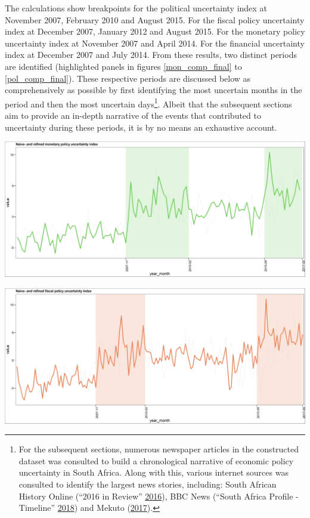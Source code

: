 \documentclass[11pt,preprint, authoryear]{elsarticle}
\let\origfigure\figure
\let\endorigfigure\endfigure
\renewenvironment{figure}[1][2] {
    \expandafter\origfigure\expandafter[H]
} {
    \endorigfigure
}
\numberwithin{equation}{section}
\numberwithin{figure}{section}
\numberwithin{table}{section}
\let\rmarkdownfootnote\footnote%
\def\footnote{\protect\rmarkdownfootnote}
\begin{document}
The calculations show breakpoints for the political
  uncertainty index at November 2007, February 2010 and August 2015. For
  the fiscal policy uncertainty index at December 2007, January 2012 and
  August 2015. For the monetary policy uncertainty index at November
  2007 and April 2014. For the financial uncertainty index at December
  2007 and July 2014. From these results, two distinct periods are
identified (highlighted panels in figures \ref{mon_comp_final} to
\ref{pol_comp_final}). These respective periods are discussed below as
comprehensively as possible by first identifying the most uncertain
months in the period and then the most uncertain days\footnote{For the
  subsequent sections, numerous newspaper articles in the constructed
  dataset was consulted to build a chronological narrative of economic
  policy uncertainty in South Africa. Along with this, various internet
  sources was consulted to identify the largest news stories, including:
  South African History Online (``2016 in Review''
  \protect\hyperlink{ref-2016}{2016}), BBC News (``South Africa Profile
  - Timeline'' \protect\hyperlink{ref-2018}{2018}) and Mekuto
  (\protect\hyperlink{ref-Mekuto2017}{2017}).}. Albeit that the
subsequent sections aim to provide an in-depth narrative of the events
that contributed to uncertainty during these periods, it is by no means
an exhaustive account.

\begin{figure}
	\centering
	\includegraphics[width=\linewidth, keepaspectratio]{bin/monetary_comps}\\
	\caption{Composite Monetary Policy uncertainty refined index.\label{mon_comp_final}}
\end{figure}



\begin{figure}
	\centering
	\includegraphics[width=\linewidth, keepaspectratio]{bin/fiscal_comps}\\
	\caption{Composite Fiscal Policy uncertainty refined index. \label{fis_comp_final}}
\end{figure}
\end{document}
